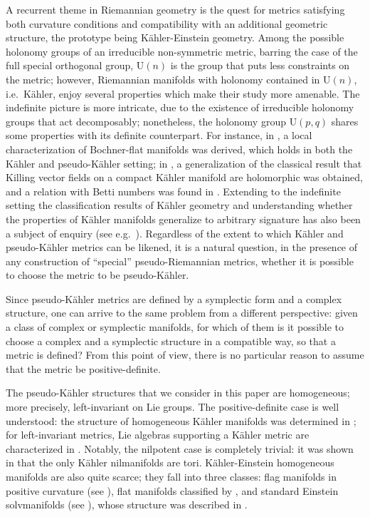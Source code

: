 \documentclass{article}
\theoremstyle{definition}
\begin{document}
A recurrent theme in Riemannian geometry is the quest for metrics satisfying both curvature conditions and compatibility with an additional geometric structure, the prototype being Kähler-Einstein geometry. Among the possible holonomy groups of an irreducible non-symmetric metric, barring the case of the full special orthogonal group, $\mathrm{U}(n)$ is the group that puts less constraints on the metric; however, Riemannian manifolds with holonomy contained in $\mathrm{U}(n)$, i.e.\ Kähler, enjoy several properties which make their study more amenable. The indefinite picture is more intricate, due to the existence of irreducible holonomy groups that act decomposably; nonetheless, the holonomy group $\mathrm{U}(p,q)$ shares some properties with its definite counterpart. For instance, in \cite{Bolsinov_Rosemann_2021}, a local characterization of Bochner-flat manifolds was derived, which holds in both the Kähler and pseudo-Kähler setting; in \cite{Derdzinski_Terek_2024}, a generalization of the classical result that Killing vector fields on a compact Kähler manifold are holomorphic was obtained, and a relation with Betti numbers was found in \cite{Yamada_2019}. Extending to the indefinite setting the classification results of Kähler geometry and understanding whether the properties of Kähler manifolds generalize to arbitrary signature has also been a subject of enquiry (see e.g.\ \cite{Petean97,LU21}). Regardless of the extent to which Kähler and pseudo-Kähler metrics can be likened, it is a natural question, in the presence of any construction of ``special'' pseudo-Riemannian metrics, whether it is possible to choose the metric to be pseudo-Kähler.\medskip

Since pseudo-Kähler metrics are defined by a symplectic form and a complex structure, one can arrive to the same problem from a different perspective: given a class of complex or symplectic manifolds, for which of them is it possible to choose a complex and a symplectic structure in a compatible way, so that a metric is defined? From this point of view, there is no particular reason to assume that the metric be positive-definite.\medskip

The pseudo-Kähler structures that we consider in this paper are homogeneous; more precisely, left-invariant on Lie groups. The positive-definite case is well understood: the structure of homogeneous Kähler manifolds was determined in \cite{DN88}; for left-invariant metrics, Lie algebras supporting a Kähler metric are characterized in \cite{Lic88,DM96}. Notably, the nilpotent case is completely trivial: it was shown in \cite{Hasegawa} that the only Kähler nilmanifolds are tori. Kähler-Einstein homogeneous manifolds are also quite scarce; they fall into three classes: flag manifolds in positive curvature (see \cite{Matsushima_1972}), flat manifolds classified by \cite{Milnor_1976}, and standard Einstein solvmanifolds (see \cite{Lauret_2010,Bohm_Lafuente_2023}), whose structure was described in \cite{Heber_1998}.\medskip
\end{document}
